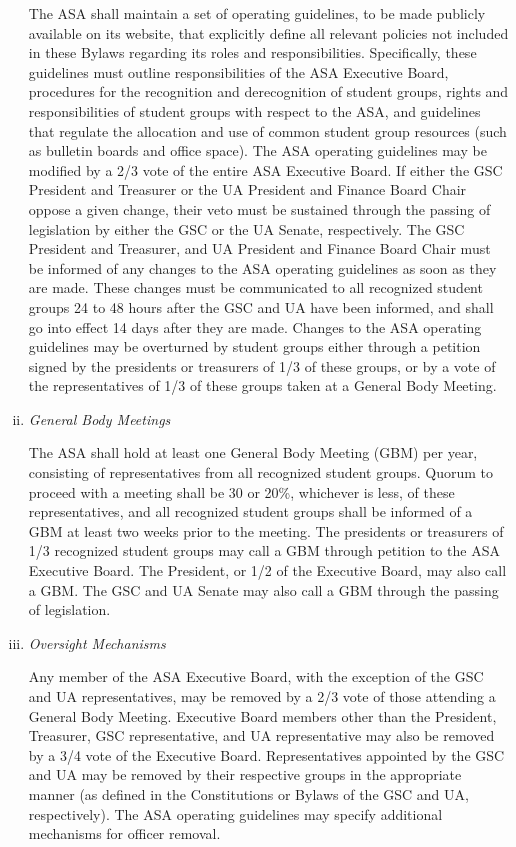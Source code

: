 \documentclass[12pt]{constitution}
\begin{document}
\begin{enumerate}[i.]
The ASA shall maintain a set of operating guidelines, to be made publicly available on its website, that
    explicitly define all relevant policies not included in these Bylaws regarding its roles and responsibilities.
Specifically, these guidelines must outline responsibilities of the ASA Executive Board, procedures for the
    recognition and derecognition of student groups, rights and responsibilities of student groups with respect to
    the ASA, and guidelines that regulate the allocation and use of common student group resources
    (such as bulletin boards and office space).
The ASA operating guidelines may be modified by a 2/3 vote of the entire ASA Executive Board.
If either the GSC President and Treasurer or the UA President and Finance Board Chair oppose a given change, their
    veto must be sustained through the passing of legislation by either the GSC or the UA Senate, respectively.
The GSC President and Treasurer, and UA President and Finance Board Chair must be informed of any changes to the
    ASA operating guidelines as soon as they are made.
These changes must be communicated to all recognized student groups 24 to 48 hours after the GSC and UA have been
    informed, and shall go into effect 14 days after they are made.
Changes to the ASA operating guidelines may be overturned by student groups either through a petition signed by
    the presidents or treasurers of 1/3 of these groups, or by a vote of the representatives of 1/3 of these
    groups taken at a General Body Meeting.

\item \textit{General Body Meetings} \label{gbms}

The ASA shall hold at least one General Body Meeting (GBM) per year, consisting of representatives from all
    recognized student groups.
Quorum to proceed with a meeting shall be 30 or 20\%, whichever is less, of these representatives, and all
    recognized student groups shall be informed of a GBM at least two weeks prior to the meeting.
The presidents or treasurers of 1/3 recognized student groups may call a GBM through petition to the
    ASA Executive Board. The President, or 1/2 of the Executive Board, may also call a GBM.
The GSC and UA Senate may also call a GBM through the passing of legislation.

\item \textit{Oversight Mechanisms}

Any member of the ASA Executive Board, with the exception of the GSC and UA representatives, may be removed by
    a 2/3 vote of those attending a General Body Meeting.
Executive Board members other than the President, Treasurer, GSC representative, and UA representative may
    also be removed by a 3/4 vote of the Executive Board.
Representatives appointed by the GSC and UA may be removed by their respective groups in the appropriate manner
    (as defined in the Constitutions or Bylaws of the GSC and UA, respectively).
The ASA operating guidelines may specify additional mechanisms for officer removal.


\end{enumerate}
\end{document}

